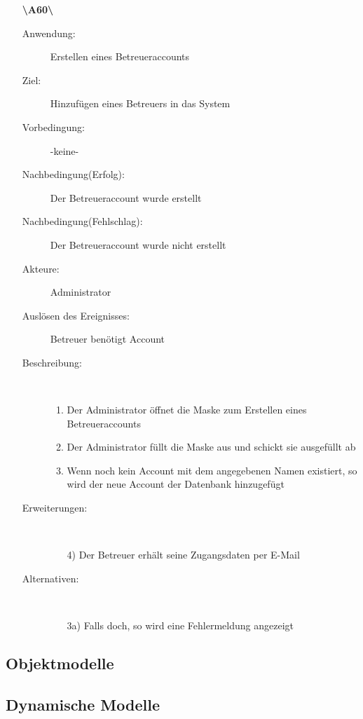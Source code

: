 \documentclass[parskip=full]{scrartcl}
\begin{document}
\begin{enumerate}
  \item[\textbf{\textbackslash A60\textbackslash}] \begin{description}
  \item[Anwendung:] Erstellen eines Betreueraccounts
  \item[Ziel:] Hinzufügen eines Betreuers in das System
  	\item[Vorbedingung:] -keine-
  	\item[Nachbedingung(Erfolg):] Der Betreueraccount wurde erstellt
  	\item[Nachbedingung(Fehlschlag):] Der Betreueraccount wurde nicht erstellt
  	\item[Akteure:] Administrator
  	\item[Auslösen des Ereignisses:] Betreuer benötigt Account
  	\item[Beschreibung:]~
  	 \begin{enumerate}[1.]
  	   \item Der Administrator öffnet die Maske zum Erstellen eines
  	   Betreueraccounts
  	   \item Der Administrator füllt die Maske aus und schickt sie ausgefüllt ab
  	   \item Wenn noch kein Account mit dem angegebenen Namen existiert, so wird
  	   der neue Account der Datenbank hinzugefügt
  	 \end{enumerate}
  	\item[Erweiterungen:]~
  	 \begin{enumerate}
  	   \item[4)] Der Betreuer erhält seine Zugangsdaten per E-Mail
  	 \end{enumerate}  
  	\item[Alternativen:] ~
  	 \begin{enumerate}
  	  \item[3a)] Falls doch, so wird eine Fehlermeldung angezeigt
  	 \end{enumerate}  
  \end{description}
  \pagebreak
\end{enumerate}  
\subsection{Objektmodelle}

\subsection{Dynamische Modelle}
\end{document}
